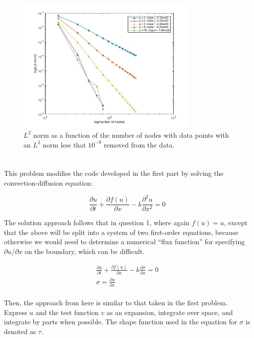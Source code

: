 \documentclass[10pt]{article}
\newcommand{\beq}{\begin{equation}}
\newcommand{\eeq}{\end{equation}}
\newcommand{\beqa}{\begin{equation}\begin{aligned}}
\newcommand{\eeqa}{\end{aligned}\end{equation}}
\begin{document}
\begin{figure}[H]
\centering
\includegraphics[width=0.8\textwidth]{figures/errors.jpg}
\caption{\(L^2\) norm as a function of the number of nodes with data points with an \(L^2\) norm less that \(10^{-9}\) removed from the data.}
\label{fig:errors}
\end{figure}






\section{}

This problem modifies the code developed in the first part by solving the convection-diffusion equation:

\beq
\frac{\partial u}{\partial t}+\frac{\partial f(u)}{\partial x}-k\frac{\partial^2 u}{\partial x^2}=0
\eeq

The solution approach follows that in question 1, where again \(f(u)=u\), except that the above will be split into a system of two first-order equations, because otherwise we would need to determine a numerical ``flux function'' for specifying \(\partial u/\partial x\) on the boundary, which can be difficult.

\beqa
\frac{\partial u}{\partial t}+\frac{\partial f(u)}{\partial x}-k\frac{\partial \sigma}{\partial x}=0\\
\sigma=\frac{\partial u}{\partial x}\\
\eeqa

Then, the approach from here is similar to that taken in the first problem. Express \(u\) and the test function \(v\) as an expansion, integrate over space, and integrate by parts when possible. The shape function used in the equation for \(\sigma\) is denoted as \(\tau\).
\end{document}

